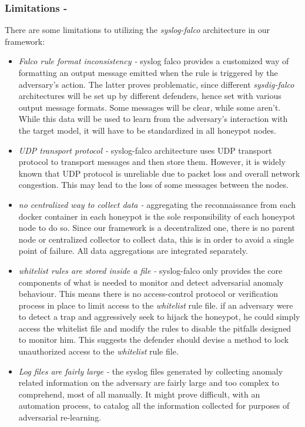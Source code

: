 \documentclass[grad,lot,lof,11pt,oneside,onehalfspace]{RUthesis}
\begin{document}
\subsubsection{Limitations -}
There are some limitations to utilizing the \textit{syslog-falco} architecture in our framework:
\begin{itemize}
	\item \textit{Falco rule format inconsistency -} syslog falco provides a customized way of formatting an output message emitted when the rule is triggered by the adversary's action. The latter proves  problematic, since different \textit{sysdig-falco} architectures will be set up by different defenders, hence set with various output message formats. Some messages will be clear, while some aren't. While this data will be used to learn from the adversary's interaction with the target model, it will have to be standardized in all honeypot nodes.  
	\item \textit{UDP transport protocol -} syslog-falco architecture uses UDP transport protocol to transport messages and then store them. However, it is widely known that UDP protocol is unreliable due to packet loss and overall network congestion. This may lead to the loss of some messages between the nodes. 
	\item \textit{no centralized way to collect data -} aggregating the reconnaissance from each docker container in each honeypot is the sole responsibility of each honeypot node to do so. Since our framework is a decentralized one, there is no parent node or centralized collector to collect data, this is in order to avoid a single point of failure. All data aggregations are integrated separately.   
	\item \textit{whitelist rules are stored inside a file -} syslog-falco only provides the core components of what is needed to monitor and detect adversarial anomaly behaviour. This means there is no access-control protocol or verification process in place to limit access to the \textit{whitelist} rule file. if an adversary were to detect a trap and aggressively seek to hijack the honeypot, he could simply access the whitelist file and modify the rules to disable the pitfalls designed to monitor him. This suggests the defender should devise a method to lock unauthorized access to the \textit{whitelist} rule file. 
	\item \textit{Log files are fairly large -}
	the syslog files generated by collecting anomaly related information on the adversary are fairly large and too complex to comprehend, most of all manually. It might prove difficult, with an automation process, to catalog all the information collected for purposes of adversarial re-learning.   
\end{itemize} 
\end{document}

